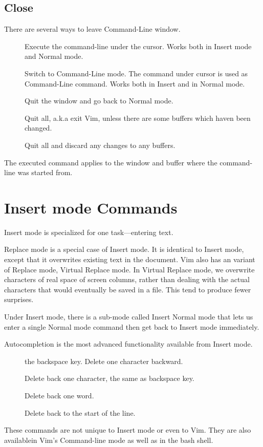 \subsection{Close}
There are several ways to leave Command-Line window.
\begin{description}
  \item[] 
Execute the command-line under the cursor.  Works both in Insert mode and Normal mode.
  \item[] Switch to Command-Line mode. The command under cursor is used as Command-Line command. Works both in Insert and in Normal mode.
  \item[] 
  \item[] Quit the window and go back to Normal mode.
  \item[] Quit all, a.k.a exit Vim, unless there are some buffers which haven been changed.
  \item[] Quit all and discard any changes to any buffers.
\end{description}
The executed command applies to the window and buffer where the command-line was started from.
\section{Insert mode Commands}
Insert mode is specialized for one task---entering text.

Replace mode is a special case of Insert mode. It is identical to Insert mode, except that it overwrites existing text in  the document. Vim also has an variant of Replace mode, Virtual Replace mode. In Virtual Replace mode, we overwrite characters of real space of screen columns, rather than dealing with the actual characters that would eventually be saved in a file. This tend to produce fewer surprises.

Under Insert mode, there is a sub-mode called Insert Normal mode that lets us enter a single Normal mode command then get back to Insert mode immediately.

Autocompletion is the most advanced functionality available from Insert mode.

\begin{description}
  \item[] the backspace key. Delete one character backward.
  \item[] Delete back one character, the same as backspace key.
  \item[] Delete back one word.
  \item[] Delete back to the start of the line.
\end{description}
These commands are not unique to Insert mode or even to Vim. They are also availablein Vim's Command-line mode as well as in the bash shell.

